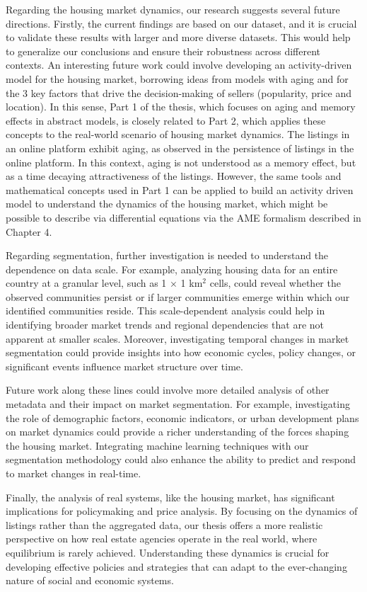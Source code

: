 Regarding the housing market dynamics, our research suggests several future directions. Firstly, the current findings are based on our dataset, and it is crucial to validate these results with larger and more diverse datasets. This would help to generalize our conclusions and ensure their robustness across different contexts. An interesting future work could involve developing an activity-driven model for the housing market, borrowing ideas from models with aging and for the 3 key factors that drive the decision-making of sellers (popularity, price and location). In this sense, Part 1 of the thesis, which focuses on aging and memory effects in abstract models, is closely related to Part 2, which applies these concepts to the real-world scenario of housing market dynamics. The listings in an online platform exhibit aging, as observed in the persistence of listings in the online platform. In this context, aging is not understood as a memory effect, but as a time decaying attractiveness of the listings. However, the same tools and mathematical concepts used in Part 1 can be applied to build an activity driven model to understand the dynamics of the housing market, which might be possible to describe via differential equations via the AME formalism described in Chapter 4.

Regarding segmentation, further investigation is needed to understand the dependence on data scale. For example, analyzing housing data for an entire country at a granular level, such as 1 $\times$ 1 km$^2$ cells, could reveal whether the observed communities persist or if larger communities emerge within which our identified communities reside. This scale-dependent analysis could help in identifying broader market trends and regional dependencies that are not apparent at smaller scales. Moreover, investigating temporal changes in market segmentation could provide insights into how economic cycles, policy changes, or significant events influence market structure over time.

Future work along these lines could involve more detailed analysis of other metadata and their impact on market segmentation. For example, investigating the role of demographic factors, economic indicators, or urban development plans on market dynamics could provide a richer understanding of the forces shaping the housing market. Integrating machine learning techniques with our segmentation methodology could also enhance the ability to predict and respond to market changes in real-time.

Finally, the analysis of real systems, like the housing market, has significant implications for policymaking and price analysis. By focusing on the dynamics of listings rather than the aggregated data, our thesis offers a more realistic perspective on how real estate agencies operate in the real world, where equilibrium is rarely achieved. Understanding these dynamics is crucial for developing effective policies and strategies that can adapt to the ever-changing nature of social and economic systems.

